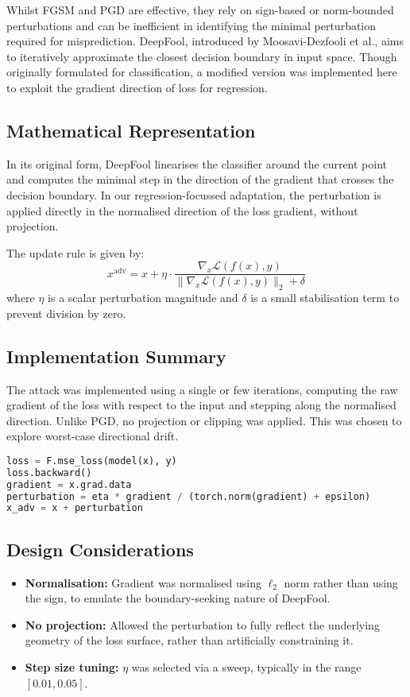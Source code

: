 Whilst FGSM and PGD are effective, they rely on sign-based or norm-bounded perturbations and can be inefficient in identifying the minimal perturbation required for misprediction. DeepFool, introduced by Moosavi-Dezfooli et al., aims to iteratively approximate the closest decision boundary in input space. Though originally formulated for classification, a modified version was implemented here to exploit the gradient direction of loss for regression.

\subsection*{Mathematical Representation}
In its original form, DeepFool linearises the classifier around the current point and computes the minimal step in the direction of the gradient that crosses the decision boundary. In our regression-focussed adaptation, the perturbation is applied directly in the normalised direction of the loss gradient, without projection.

The update rule is given by:
\[
x^{\text{adv}} = x + \eta \cdot \frac{\nabla_x \mathcal{L}(f(x), y)}{ \| \nabla_x \mathcal{L}(f(x), y) \|_2 + \delta }
\]
where $\eta$ is a scalar perturbation magnitude and $\delta$ is a small stabilisation term to prevent division by zero.

\subsection*{Implementation Summary}
The attack was implemented using a single or few iterations, computing the raw gradient of the loss with respect to the input and stepping along the normalised direction. Unlike PGD, no projection or clipping was applied. This was chosen to explore worst-case directional drift.

\begin{lstlisting}[language=Python, caption={Directional (DeepFool-like) Gradient Attack}]
loss = F.mse_loss(model(x), y)
loss.backward()
gradient = x.grad.data
perturbation = eta * gradient / (torch.norm(gradient) + epsilon)
x_adv = x + perturbation
\end{lstlisting}

\subsection*{Design Considerations}
\begin{itemize}
    \item \textbf{Normalisation:} Gradient was normalised using $\ell_2$ norm rather than using the sign, to emulate the boundary-seeking nature of DeepFool.
    \item \textbf{No projection:} Allowed the perturbation to fully reflect the underlying geometry of the loss surface, rather than artificially constraining it.
    \item \textbf{Step size tuning:} $\eta$ was selected via a sweep, typically in the range $[0.01, 0.05]$.
\end{itemize}

